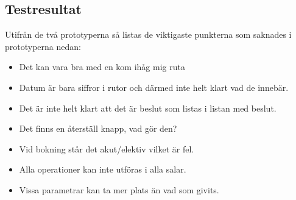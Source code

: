 \documentclass[a4paper,10pt, twoside]{article}
\begin{document}
\subsection{Testresultat}
Utifrån de två prototyperna så listas de viktigaste punkterna som saknades i prototyperna nedan:
\begin{itemize}
\item Det kan vara bra med en kom ihåg mig ruta
\item Datum är bara siffror i rutor och därmed inte helt klart vad de innebär.
\item Det är inte helt klart att det är beslut som listas i listan med beslut.
\item Det finns en återställ knapp, vad gör den?
\item Vid bokning står det akut/elektiv vilket är fel.
\item Alla operationer kan inte utföras i alla salar.
\item Vissa parametrar kan ta mer plats än vad som givits.

\end{itemize}
\end{document}
